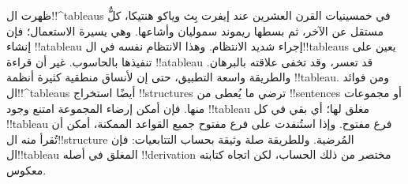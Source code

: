 \documentclass[../../../include/open-logic-section]{subfiles}
\begin{document}
ظهرت ال!!^{tableau}s في خمسينيات القرن العشرين عند إيفرت بِث وياكو هنتيكا، كلٌّ مستقل عن الآخر، ثم بسطها ريموند سموليان وأشاعها.
وهي يسيرة الاستعمال؛ فإن إنشاء !!a{tableau} إجراء شديد الانتظام. وهذا الانتظام نفسه في ال!!{tableau}s يعين على تنفيذها بالحاسوب.
غير أن قراءة !!a{tableau} قد تعسر، وقد تخفى علاقته بالبرهان. والطريقة واسعة التطبيق، حتى إن لأنساق منطقية كثيرة أنظمة
!!{tableau}. ومن فوائد ال!!^{tableau}s أيضًا استخراج
!!{structure}s ترضي ما يُعطى من !!{sentence}s أو مجموعات منها.
فإن أمكن إرضاء المجموعة امتنع وجود !!{tableau} مغلق لها؛ أي بقي في كل
!!{tableau} فرع مفتوح. وإذا استُنفدت على فرع مفتوح جميع القواعد الممكنة، أمكن أن تُقرأ منه ال!!{structure} المُرضية.
وللطريقة صلة وثيقة بحساب التتابعيات: فإن ال!!{tableau} المغلق في أصله
!!{derivation} مختصر من ذلك الحساب، لكن اتجاه كتابته معكوس.
\end{document}

